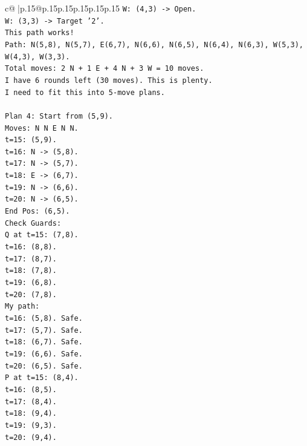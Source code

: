 \documentclass{article}
\begin{document}
{\begin{supertabular}{c@{$\;$}|p{.15\linewidth}@{}p{.15\linewidth}p{.15\linewidth}p{.15\linewidth}p{.15\linewidth}p{.15\linewidth}}
{{{\texttt{W: (4,3) {-}> Open.} \\
\texttt{W: (3,3) {-}> Target '2'.} \\
\texttt{This path works!} \\
\texttt{Path: N(5,8), N(5,7), E(6,7), N(6,6), N(6,5), N(6,4), N(6,3), W(5,3), W(4,3), W(3,3).} \\
\texttt{Total moves: 2 N + 1 E + 4 N + 3 W = 10 moves.} \\
\texttt{I have 6 rounds left (30 moves). This is plenty.} \\
\texttt{I need to fit this into 5{-}move plans.} \\
\\ 
\texttt{Plan 4: Start from (5,9).} \\
\texttt{Moves: N N E N N.} \\
\texttt{t=15: (5,9).} \\
\texttt{t=16: N {-}> (5,8).} \\
\texttt{t=17: N {-}> (5,7).} \\
\texttt{t=18: E {-}> (6,7).} \\
\texttt{t=19: N {-}> (6,6).} \\
\texttt{t=20: N {-}> (6,5).} \\
\texttt{End Pos: (6,5).} \\
\texttt{Check Guards:} \\
\texttt{Q at t=15: (7,8).} \\
\texttt{t=16: (8,8).} \\
\texttt{t=17: (8,7).} \\
\texttt{t=18: (7,8).} \\
\texttt{t=19: (6,8).} \\
\texttt{t=20: (7,8).} \\
\texttt{My path:} \\
\texttt{t=16: (5,8). Safe.} \\
\texttt{t=17: (5,7). Safe.} \\
\texttt{t=18: (6,7). Safe.} \\
\texttt{t=19: (6,6). Safe.} \\
\texttt{t=20: (6,5). Safe.} \\
\texttt{P at t=15: (8,4).} \\
\texttt{t=16: (8,5).} \\
\texttt{t=17: (8,4).} \\
\texttt{t=18: (9,4).} \\
\texttt{t=19: (9,3).} \\
\texttt{t=20: (9,4).} \\
}}}
\end{supertabular}}
\end{document}
